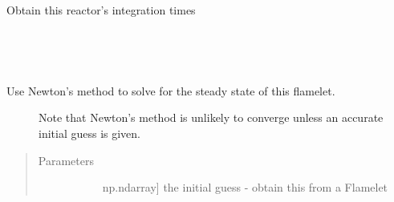 \documentclass[letterpaper,10pt,english]{sphinxmanual}
\begin{document}
\begin{fulllineitems}
\begin{fulllineitems}
\begin{quote}
\begin{description}
\begin{description}
\end{description}

\end{description}\end{quote}

\end{fulllineitems}


\begin{fulllineitems}
\label{\detokenize{spitfire.chemistry.flamelet:spitfire.chemistry.flamelet.Flamelet.solution_times}}
Obtain this reactor’s integration times

\end{fulllineitems}


\begin{fulllineitems}
\label{\detokenize{spitfire.chemistry.flamelet:spitfire.chemistry.flamelet.Flamelet.state_with_bcs}}~
\end{fulllineitems}


\begin{fulllineitems}
\label{\detokenize{spitfire.chemistry.flamelet:spitfire.chemistry.flamelet.Flamelet.steady_solve_newton}}~\begin{description}
\item[{Use Newton’s method to solve for the steady state of this flamelet.}] \leavevmode
Note that Newton’s method is unlikely to converge unless an accurate initial guess is given.

\end{description}
\begin{quote}\begin{description}
\item[{Parameters}] \leavevmode\begin{description}
\item[{}] \leavevmode{[}np.ndarray{]}
the initial guess - obtain this from a Flamelet


\end{description}
\end{description}
\end{quote}
\end{fulllineitems}
\end{fulllineitems}
\end{document}
